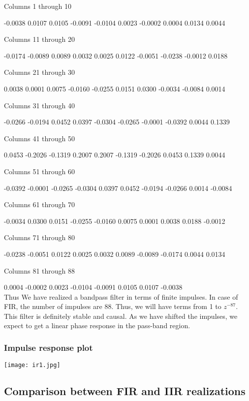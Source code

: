 \documentclass[12pt]{article}
\begin{document}
  Columns 1 through 10

   -0.0038    0.0107    0.0105   -0.0091   -0.0104    0.0023   -0.0002    0.0004    0.0134    0.0044

  Columns 11 through 20

   -0.0174   -0.0089    0.0089    0.0032    0.0025    0.0122   -0.0051   -0.0238   -0.0012    0.0188

  Columns 21 through 30

    0.0038    0.0001    0.0075   -0.0160   -0.0255    0.0151    0.0300   -0.0034   -0.0084    0.0014

  Columns 31 through 40

   -0.0266   -0.0194    0.0452    0.0397   -0.0304   -0.0265   -0.0001   -0.0392    0.0044    0.1339

  Columns 41 through 50

    0.0453   -0.2026   -0.1319    0.2007    0.2007   -0.1319   -0.2026    0.0453    0.1339    0.0044

  Columns 51 through 60

   -0.0392   -0.0001   -0.0265   -0.0304    0.0397    0.0452   -0.0194   -0.0266    0.0014   -0.0084

  Columns 61 through 70

   -0.0034    0.0300    0.0151   -0.0255   -0.0160    0.0075    0.0001    0.0038    0.0188   -0.0012

  Columns 71 through 80

   -0.0238   -0.0051    0.0122    0.0025    0.0032    0.0089   -0.0089   -0.0174    0.0044    0.0134

  Columns 81 through 88

    0.0004   -0.0002    0.0023   -0.0104   -0.0091    0.0105    0.0107   -0.0038
   \\Thus We have realized a bandpass filter in terms of finite impulses. In case of FIR, the number of impulses
are 88. Thus, we will have terms from 1 to $z^{-87}$. This filter is definitely stable and causal. As we have
shifted the impulses, we expect to get a linear phase response in the pass-band region.
\subsubsection{Impulse response plot}
\begin{center}
    \texttt{[image: ir1.jpg]}
\end{center}


\subsection{Comparison between FIR and IIR realizations}
\end{document}
